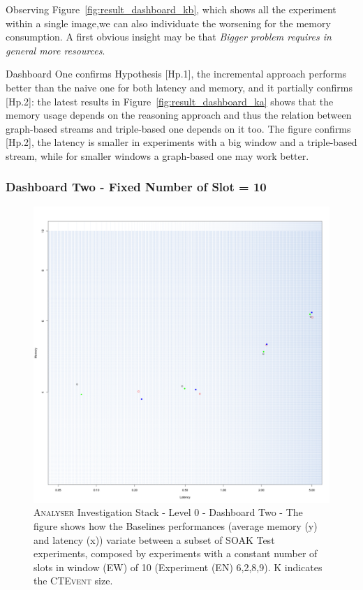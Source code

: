 Observing Figure~\ref{fig:result_dashboard_kb}, which shows all the experiment within a single image,we can also individuate the worsening for the memory consumption. A first obvious insight may be that \textit{Bigger problem requires in general more resources}. %

Dashboard One confirms Hypothesis [Hp.1], the incremental approach performs better than the naive one for both latency and memory, and it partially confirms  [Hp.2]: the latest results in Figure~\ref{fig:result_dashboard_ka} shows that the memory usage depends on the reasoning approach and thus the relation between graph-based streams and triple-based one depends on it too. The figure confirms [Hp.2], the latency is smaller in experiments with a big window and a triple-based stream, while for smaller windows a graph-based one may work better.


\subsubsection{Dashboard Two - Fixed Number of Slot = 10}


\begin{figure}[h!tbp]
	\centering
	\includegraphics[width=0.85\linewidth]{images/dashboard-2}	
	\caption[\textsc{Analyser} Investigation Stack - Level 0 - Dashboard Two - Multiplot Version]{\textsc{Analyser} Investigation Stack - Level 0 - Dashboard Two - The figure shows how the Baselines performances (average memory (y) and latency (x)) variate between a subset of SOAK Test experiments, composed by experiments with a constant number of slots in window (EW) of 10 (Experiment (EN) 6,2,8,9). K indicates the \textsc{CTEvent} size. } 	
	
	\label{fig:result_dashboard_ewb}
\end{figure}

